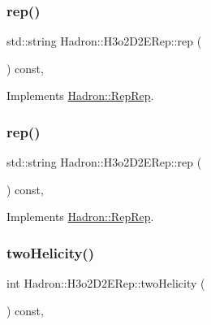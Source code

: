 \subsubsection{\texorpdfstring{rep()}{rep()}\hspace{0.1cm}{\footnotesize\ttfamily [4/5]}}
{\footnotesize\ttfamily std\+::string Hadron\+::\+H3o2\+D2\+E\+Rep\+::rep (\begin{DoxyParamCaption}{ }\end{DoxyParamCaption}) const\hspace{0.3cm}{\ttfamily [inline]}, {\ttfamily [virtual]}}



Implements \mbox{\hyperlink{structHadron_1_1RepRep_ab3213025f6de249f7095892109575fde}{Hadron\+::\+Rep\+Rep}}.

\mbox{\label{structHadron_1_1H3o2D2ERep_a62c37bd67dbe2ba7fd36b57f0a069aa7}} 
\subsubsection{\texorpdfstring{rep()}{rep()}\hspace{0.1cm}{\footnotesize\ttfamily [5/5]}}
{\footnotesize\ttfamily std\+::string Hadron\+::\+H3o2\+D2\+E\+Rep\+::rep (\begin{DoxyParamCaption}{ }\end{DoxyParamCaption}) const\hspace{0.3cm}{\ttfamily [inline]}, {\ttfamily [virtual]}}



Implements \mbox{\hyperlink{structHadron_1_1RepRep_ab3213025f6de249f7095892109575fde}{Hadron\+::\+Rep\+Rep}}.

\mbox{\label{structHadron_1_1H3o2D2ERep_a834909b5a05a1e80078eec2e2349831b}} 
\subsubsection{\texorpdfstring{twoHelicity()}{twoHelicity()}\hspace{0.1cm}{\footnotesize\ttfamily [1/3]}}
{\footnotesize\ttfamily int Hadron\+::\+H3o2\+D2\+E\+Rep\+::two\+Helicity (\begin{DoxyParamCaption}{ }\end{DoxyParamCaption}) const\hspace{0.3cm}{\ttfamily [inline]}, {\ttfamily [virtual]}}

